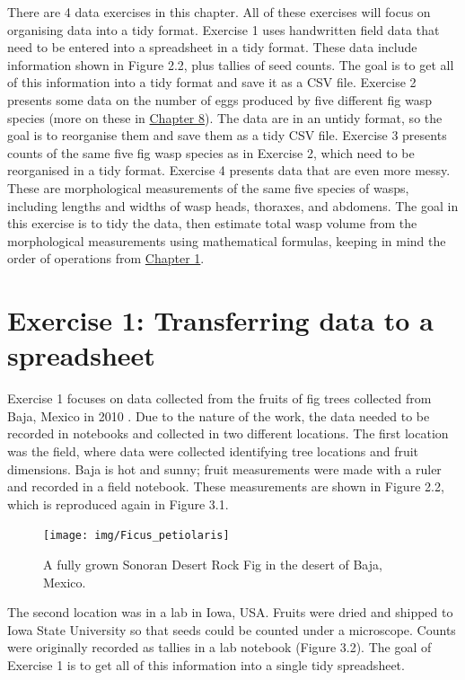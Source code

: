 \documentclass[
]{scrbook}
\begin{document}
There are 4 data exercises in this chapter.
All of these exercises will focus on organising data into a tidy format.
Exercise 1 uses handwritten field data that need to be entered into a spreadsheet in a tidy format.
These data include information shown in Figure 2.2, plus tallies of seed counts.
The goal is to get all of this information into a tidy format and save it as a CSV file.
Exercise 2 presents some data on the number of eggs produced by five different fig wasp species (more on these in \protect\hyperlink{Chapter_8}{Chapter 8}).
The data are in an untidy format, so the goal is to reorganise them and save them as a tidy CSV file.
Exercise 3 presents counts of the same five fig wasp species as in Exercise 2, which need to be reorganised in a tidy format.
Exercise 4 presents data that are even more messy.
These are morphological measurements of the same five species of wasps, including lengths and widths of wasp heads, thoraxes, and abdomens.
The goal in this exercise is to tidy the data, then estimate total wasp volume from the morphological measurements using mathematical formulas, keeping in mind the order of operations from \protect\hyperlink{Chapter_1}{Chapter 1}.

\hypertarget{exercise-1-transferring-data-to-a-spreadsheet}{%
\section{Exercise 1: Transferring data to a spreadsheet}\label{exercise-1-transferring-data-to-a-spreadsheet}}

Exercise 1 focuses on data collected from the fruits of fig trees collected from Baja, Mexico in 2010 \citep{Duthie2015b, Duthie2016}.
Due to the nature of the work, the data needed to be recorded in notebooks and collected in two different locations.
The first location was the field, where data were collected identifying tree locations and fruit dimensions.
Baja is hot and sunny; fruit measurements were made with a ruler and recorded in a field notebook.
These measurements are shown in Figure 2.2, which is reproduced again in Figure 3.1.

\begin{figure}
\texttt{[image: img/Ficus\_petiolaris]} \caption{A fully grown Sonoran Desert Rock Fig in the desert of Baja, Mexico.}\label{fig:unnamed-chunk-10}
\end{figure}

The second location was in a lab in Iowa, USA.
Fruits were dried and shipped to Iowa State University so that seeds could be counted under a microscope.
Counts were originally recorded as tallies in a lab notebook (Figure 3.2).
The goal of Exercise 1 is to get all of this information into a single tidy spreadsheet.
\end{document}
